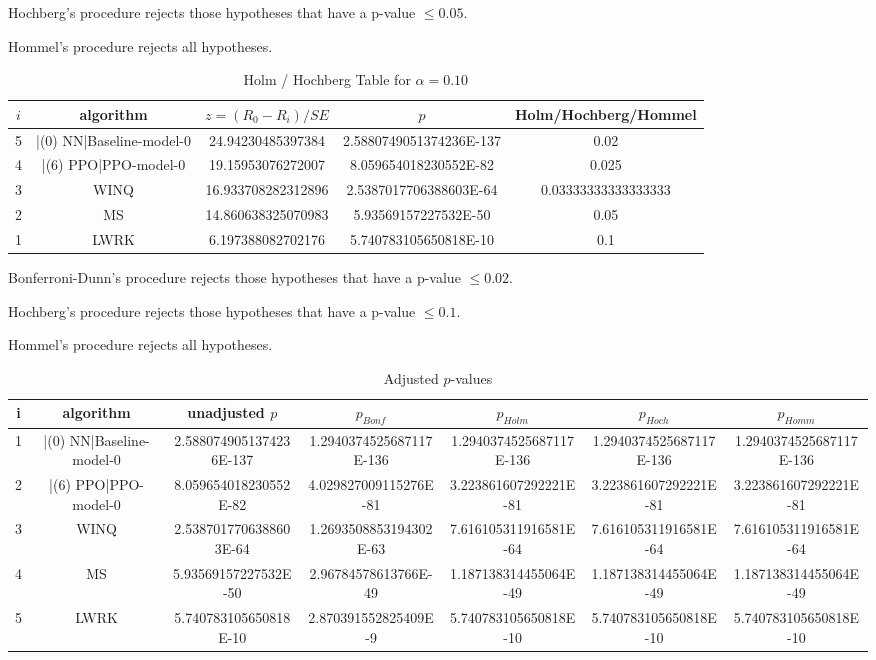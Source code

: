 \documentclass[a3paper,10pt]{article}
\begin{document}
Hochberg's procedure rejects those hypotheses that have a p-value $\le0.05$.


Hommel's procedure rejects all hypotheses.


\begin{table}[!htp]
\centering\tiny
\caption{Holm / Hochberg Table for $\alpha=0.10$}
\begin{tabular}{ccccc}
$i$&algorithm&$z=(R_0 - R_i)/SE$&$p$&Holm/Hochberg/Hommel\\
\hline
5&|(0) NN|Baseline-model-0&24.94230485397384&2.5880749051374236E-137&0.02\\
4&|(6) PPO|PPO-model-0&19.15953076272007&8.059654018230552E-82&0.025\\
3&WINQ&16.933708282312896&2.5387017706388603E-64&0.03333333333333333\\
2&MS&14.860638325070983&5.93569157227532E-50&0.05\\
1&LWRK&6.197388082702176&5.740783105650818E-10&0.1\\
\hline
\end{tabular}
\end{table}
Bonferroni-Dunn's procedure rejects those hypotheses that have a p-value $\le0.02$.


Hochberg's procedure rejects those hypotheses that have a p-value $\le0.1$.


Hommel's procedure rejects all hypotheses.


\begin{table}[!htp]
\centering\tiny
\caption{Adjusted $p$-values}
\begin{tabular}{ccccccc}
i&algorithm&unadjusted $p$&$p_{Bonf}$&$p_{Holm}$&$p_{Hoch}$&$p_{Homm}$\\
\hline
1&|(0) NN|Baseline-model-0&2.5880749051374236E-137&1.2940374525687117E-136&1.2940374525687117E-136&1.2940374525687117E-136&1.2940374525687117E-136\\
2&|(6) PPO|PPO-model-0&8.059654018230552E-82&4.029827009115276E-81&3.223861607292221E-81&3.223861607292221E-81&3.223861607292221E-81\\
3&WINQ&2.5387017706388603E-64&1.2693508853194302E-63&7.616105311916581E-64&7.616105311916581E-64&7.616105311916581E-64\\
4&MS&5.93569157227532E-50&2.96784578613766E-49&1.187138314455064E-49&1.187138314455064E-49&1.187138314455064E-49\\
5&LWRK&5.740783105650818E-10&2.870391552825409E-9&5.740783105650818E-10&5.740783105650818E-10&5.740783105650818E-10\\
\hline
\end{tabular}
\end{table}
\end{document}
